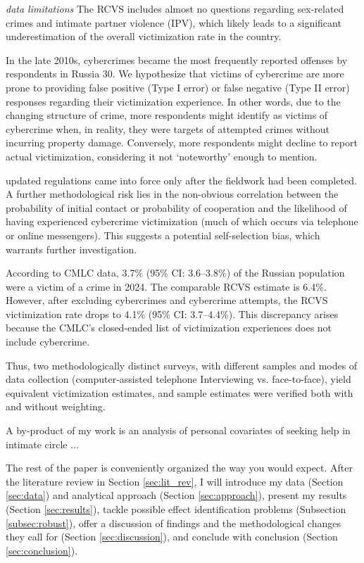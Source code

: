 \documentclass[]{article}
\begin{document}
\textit{data limitations}
The RCVS includes almost no questions regarding sex-related crimes and intimate partner violence (IPV), which likely leads to a significant underestimation of the overall victimization rate in the country.

In the late 2010s, cybercrimes became the most frequently reported offenses by respondents in Russia 30. We hypothesize that victims of cybercrime are more prone to providing false positive (Type I error) or false negative (Type II error) responses regarding their victimization experience. In other words, due to the changing structure of crime, more respondents might identify as victims of cybercrime when, in reality, they were targets of attempted crimes without incurring property damage. Conversely, more respondents might decline to report actual victimization, considering it not ‘noteworthy’ enough to mention.

updated regulations came into force only after the fieldwork had been completed.  A further methodological risk lies in the non-obvious correlation between the probability of initial contact or probability of cooperation and the likelihood of having experienced cybercrime victimization (much of which occurs via telephone or online messengers). This suggests a potential self-selection bias, which warrants further investigation.

According to CMLC data, 3.7\% (95\% CI: 3.6–3.8\%) of the Russian population were a victim of a crime in 2024. The comparable RCVS estimate is 6.4\%. However, after excluding cybercrimes and cybercrime attempts, the RCVS victimization rate drops to 4.1\% (95\% CI: 3.7–4.4\%). This discrepancy arises because the CMLC’s closed-ended list of victimization experiences does not include cybercrime.



Thus, two methodologically distinct surveys, with different samples and modes of data collection (computer-assisted telephone Interviewing vs. face-to-face), yield equivalent victimization estimates, and sample estimates were verified both with and without weighting.



A by-product of my work is an analysis of personal covariates of seeking help in intimate circle ...

The rest of the paper is conveniently organized the way you would expect. After the literature review in Section \ref{sec:lit_rev}, I will introduce my data (Section \ref{sec:data}) and analytical approach (Section \ref{sec:approach}), present my results (Section \ref{sec:results}), tackle possible effect identification problems (Subsection \ref{subsec:robust}), offer a discussion of findings and the methodological changes they call for (Section \ref{sec:discussion}), and conclude with conclusion (Section \ref{sec:conclusion}).
\end{document}

